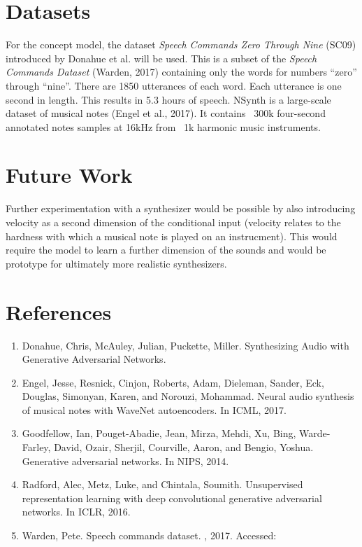 \documentclass{article}
\begin{document}
\section{Datasets}

For the concept model, the dataset \textit{Speech Commands Zero Through Nine} (SC09) introduced by Donahue et al. will be used.
This is a subset of the \textit{Speech Commands Dataset} (Warden, 2017) containing only the words for numbers ``zero'' through ``nine''.
There are 1850 utterances of each word.
Each utterance is one second in length.
This results in 5.3 hours of speech.
\newline
\newline
NSynth is a large-scale dataset of musical notes (Engel et al., 2017).
It contains ~300k four-second annotated notes samples at 16kHz from ~1k harmonic music instruments.

\section{Future Work}

Further experimentation with a synthesizer would be possible by also introducing velocity as a second dimension of the conditional input (velocity relates to the hardness with which a musical note is played on an instrucment).
This would require the model to learn a further dimension of the sounds and would be prototype for ultimately more realistic synthesizers.

\section{References}

\begin{enumerate}

\item
  Donahue, Chris, McAuley, Julian, Puckette, Miller. Synthesizing Audio with Generative Adversarial Networks.
\item
  Engel, Jesse, Resnick, Cinjon, Roberts, Adam, Dieleman, Sander, Eck, Douglas, Simonyan, Karen, and Norouzi, Mohammad. Neural audio synthesis of musical notes with WaveNet autoencoders. In ICML, 2017.
\item
  Goodfellow, Ian, Pouget-Abadie, Jean, Mirza, Mehdi, Xu, Bing, Warde-Farley, David, Ozair, Sherjil, Courville, Aaron, and Bengio, Yoshua. Generative adversarial networks. In NIPS, 2014.
\item
  Radford, Alec, Metz, Luke, and Chintala, Soumith. Unsupervised representation learning with deep convolutional generative adversarial networks. In ICLR, 2016.
\item
  Warden, Pete. Speech commands dataset.
, 2017.
Accessed:

\end{enumerate}

\end{document}
